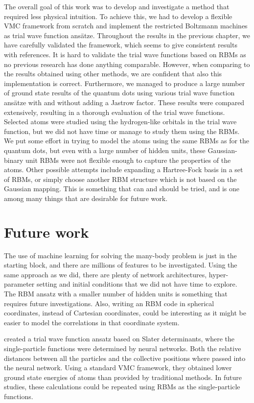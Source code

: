 The overall goal of this work was to develop and investigate a method that required less physical intuition. To achieve this, we had to develop a flexible VMC framework from scratch and implement the restricted Boltzmann machines as trial wave function ansätze. Throughout the results in the previous chapter, we have carefully validated the framework, which seems to give consistent results with references. It is hard to validate the trial wave functions based on RBMs as no previous research has done anything comparable. However, when comparing to the results obtained using other methods, we are confident that also this implementation is correct. Furthermore, we managed to produce a large number of ground state results of the quantum dots using various trial wave function ansätze with and without adding a Jastrow factor. These results were compared extensively, resulting in a thorough evaluation of the trial wave functions. Selected atoms were studied using the hydrogen-like orbitals in the trial wave function, but we did not have time or manage to study them using the RBMs. We put some effort in trying to model the atoms using the same RBMs as for the quantum dots, but even with a large number of hidden units, these Gaussian-binary unit RBMs were not flexible enough to capture the properties of the atoms. Other possible attempts include expanding a Hartree-Fock basis in a set of RBMs, or simply choose another RBM structure which is not based on the Gaussian mapping. This is something that can and should be tried, and is one among many things that are desirable for future work.

\section*{Future work}
The use of machine learning for solving the many-body problem is just in the starting block, and there are millions of features to be investigated. Using the same approach as we did, there are plenty of network architectures, hyper-parameter setting and initial conditions that we did not have time to explore. The RBM ansatz with a smaller number of hidden units is something that requires future investigations. Also, writing an RBM code in spherical coordinates, instead of Cartesian coordinates, could be interesting as it might be easier to model the correlations in that coordinate system.

\citet{pfau2019abinitio} created a trial wave function ansatz based on Slater determinants, where the single-particle functions were determined by neural networks. Both the relative distances between all the particles and the collective positions where passed into the neural network. Using a standard VMC framework, they obtained lower ground state energies of atoms than provided by traditional methods. In future studies, these calculations could be repeated using RBMs as the single-particle functions.

